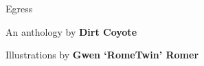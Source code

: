 \documentclass[11pt]{memoir}
\begin{document}
  \frontmatter
  \pagestyle{empty}


  \begin{flushright}
  \null
  \vfill
  \large{}
  \vfill
  \end{flushright}

  \cleardoublepage
  \doublespacing

  \null
  \vfill
  \begin{center}
    \TitleFamily
    \Huge{Egress}
    
    \vfill
  
    \Large{An anthology by \textbf{Dirt Coyote}

    Illustrations by \textbf{Gwen ‘RomeTwin’ Romer}}
  \end{center}
  \thispagestyle{empty}

  \newpage

  

  \cleardoublepage
  \tableofcontents*
  \newpage
  \null
  \cleardoublepage
  \pagestyle{ourbook}

  
\end{document}
